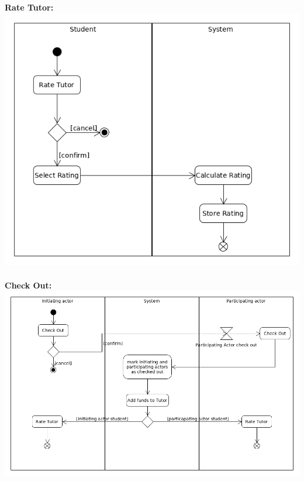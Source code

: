 \documentclass[12pt]{article}
\begin{document}
\pagebreak
\\\\\textbf{Rate Tutor:}\\
\includegraphics[width=140mm]{./activity_diagram/rate_tutor.png}
\\\\\textbf{Check Out:}\\
\includegraphics[width=140mm]{./activity_diagram/check_out.png}

\newpage
\end{document}
